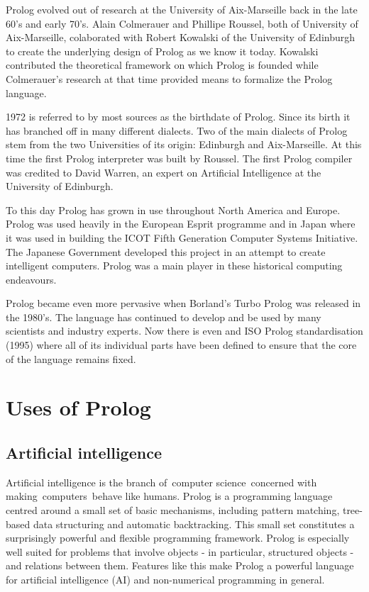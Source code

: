 \documentclass[14pt]{article}
\begin{document}
Prolog evolved out of research at the University of Aix-Marseille back in the late 60's and early 70's. Alain Colmerauer and Phillipe Roussel, both of University of Aix-Marseille, colaborated with Robert Kowalski of the University of Edinburgh to create the underlying design of Prolog as we know it today. Kowalski contributed the theoretical framework on which Prolog is founded while Colmerauer's research at that time provided means to formalize the Prolog language. 

1972 is referred to by most sources as the birthdate of Prolog. Since its birth it has branched off in many different dialects. Two of the main dialects of Prolog stem from the two Universities of its origin: Edinburgh and Aix-Marseille. At this time the first Prolog interpreter was built by Roussel. The first Prolog compiler was credited to David Warren, an expert on Artificial Intelligence at the University of Edinburgh. 

To this day Prolog has grown in use throughout North America and Europe. Prolog was used heavily in the European Esprit programme and in Japan where it was used in building the ICOT Fifth Generation Computer Systems Initiative. The Japanese Government developed this project in an attempt to create intelligent computers. Prolog was a main player in these historical computing endeavours. 

Prolog became even more pervasive when Borland's Turbo Prolog was released in the 1980's. The language has continued to develop and be used by many scientists and industry experts. Now there is even and ISO Prolog standardisation (1995) where all of its individual parts have been defined to ensure that the core of the language remains fixed. 
\newpage 
\section{Uses of Prolog}
\subsection{Artificial intelligence}

Artificial intelligence is the branch of computer science concerned with making computers behave like humans. Prolog is a programming language centred around a small set of basic mechanisms, including pattern matching, tree-based data structuring and automatic backtracking. This small set constitutes a surprisingly powerful and flexible programming framework. Prolog is especially well suited for problems that involve objects - in particular, structured objects - and relations between them. Features like this make Prolog a powerful language for artificial intelligence (AI) and non-numerical programming in general.
\end{document}
